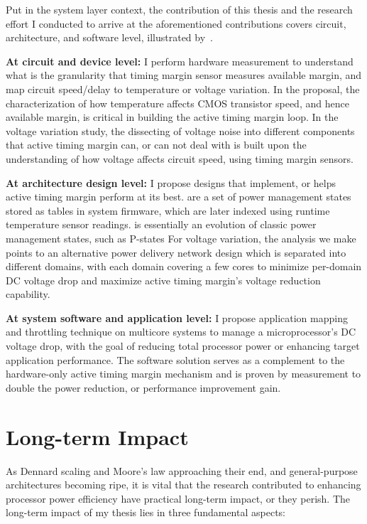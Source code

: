 Put in the system layer context, the contribution of this thesis and the research effort I conducted to arrive at the aforementioned contributions covers circuit, architecture, and software level, illustrated by~.

\textbf{At circuit and device level:} I perform hardware measurement to understand what is the granularity that timing margin sensor measures available margin, and map circuit speed/delay to temperature or voltage variation. In the \tistates proposal, the characterization of how temperature affects CMOS transistor speed, and hence available margin, is critical in building the active timing margin loop. In the voltage variation study, the dissecting of voltage noise into different components that active timing margin can, or can not deal with is built upon the understanding of how voltage affects circuit speed, using timing margin sensors.

\textbf{At architecture design level:} I propose designs that implement, or helps active timing margin perform at its best. \tistates are a set of power management states stored as tables in system firmware, which are later indexed using runtime temperature sensor readings. \tistate is essentially an evolution of classic power management states, such as P-states For voltage variation, the analysis we make points to an alternative power delivery network design which is separated into different domains, with each domain covering a few cores to minimize per-domain DC voltage drop and maximize active timing margin's voltage reduction capability.

\textbf{At system software and application level:} I propose application mapping and throttling technique on multicore systems to manage a microprocessor's DC voltage drop, with the goal of reducing total processor power or enhancing target application performance. The software solution serves as a complement to the hardware-only active timing margin mechanism and is proven by measurement to double the power reduction, or performance improvement gain.

\section{Long-term Impact}
\label{sec:intro:impact}

As Dennard scaling and Moore's law approaching their end, and general-purpose architectures becoming ripe, it is vital that the research contributed to enhancing processor power efficiency have practical long-term impact, or they perish. The long-term impact of my thesis lies in three fundamental aspects:

